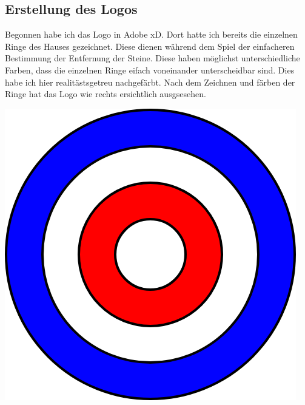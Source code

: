\documentclass[11pt]{article}
\begin{document}
    \noindent\begin{minipage}{0.6\textwidth}
                 \subsection{Erstellung des Logos}
                 Begonnen habe ich das Logo in Adobe xD. Dort hatte ich bereits die einzelnen Ringe des Hauses gezeichnet.
                 Diese dienen während dem Spiel der einfacheren Bestimmung der Entfernung der Steine. Diese haben
                 möglichst unterschiedliche Farben, dass die einzelnen Ringe eifach voneinander unterscheidbar sind.
                 Dies habe ich hier realitästsgetreu nachgefärbt. Nach dem Zeichnen und färben der Ringe hat das Logo
                 wie rechts ersichtlich ausgsesehen.
    \end{minipage}
    \hfill
    \begin{minipage}[c]{0.3\textwidth}
        \raggedleft
        \includegraphics[width=\linewidth]{media/curling_logo_step1}
    \end{minipage}
\end{document}
